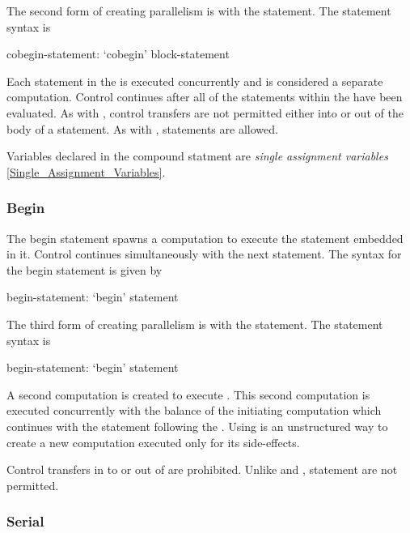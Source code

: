 The second form of creating parallelism is with the 
statement. The  statement syntax is
\begin{syntax}
cobegin-statement:
  `cobegin' block-statement
\end{syntax}
Each statement in the  is executed concurrently
and is considered a separate computation. Control continues after all
of the statements within the  have been
evaluated. As with , control transfers are not permitted
either into or out of the body of a  statement. As
with ,  statements are allowed.

Variables declared in the  compound statment are {\em single
assignment variables} \ref{Single_Assignment_Variables}. 

\subsubsection{Begin}
\label{Begin}

The begin statement spawns a computation to execute the statement
embedded in it.  Control continues simultaneously with the next
statement.  The syntax for the begin statement is given by
\begin{syntax}
begin-statement:
  `begin' statement
\end{syntax}

The third form of creating parallelism is with the 
statement. The  statement syntax is
\begin{syntax}
begin-statement:
  `begin' statement
\end{syntax}
A second computation is created to execute .
This second computation is executed concurrently with the balance of
the initiating computation which continues with the statement
following the . Using  is an unstructured way to 
create a new computation executed only for its side-effects.

Control transfers in to or out of  are prohibited. Unlike
 and ,  statement are not permitted.


\subsubsection{Serial}
\label{Serial}

